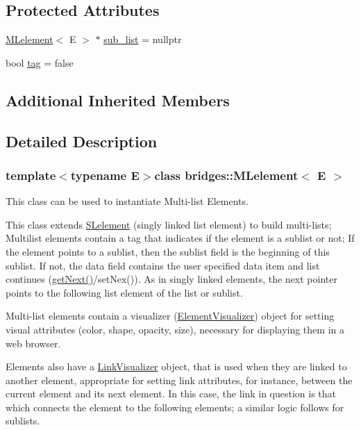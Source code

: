 \subsection*{Protected Attributes}
\begin{DoxyCompactItemize}
\item 
\hyperlink{classbridges_1_1_m_lelement}{M\+Lelement}$<$ E $>$ $\ast$ \hyperlink{classbridges_1_1_m_lelement_aa664b4e694c08e5cc31cc9d317dda100}{sub\+\_\+list} = nullptr
\item 
bool \hyperlink{classbridges_1_1_m_lelement_a0285a07355b2bc3d064c30e20aa2fd55}{tag} = false
\end{DoxyCompactItemize}
\subsection*{Additional Inherited Members}


\subsection{Detailed Description}
\subsubsection*{template$<$typename E$>$class bridges\+::\+M\+Lelement$<$ E $>$}

This class can be used to instantiate Multi-\/list Elements. 

This class extends \hyperlink{classbridges_1_1_s_lelement}{S\+Lelement} (singly linked list element) to build multi-\/lists; Multilist elements contain a tag that indicates if the element is a sublist or not; If the element points to a sublist, then the sublist field is the beginning of this sublist. If not, the data field contains the user specified data item and list continues (\hyperlink{classbridges_1_1_m_lelement_aceebd292e7d497f44eea5c4845e7709f}{get\+Next()}/set\+Nex()). As in singly linked elements, the next pointer points to the following list element of the list or sublist.

Multi-\/list elements contain a visualizer (\hyperlink{classbridges_1_1_element_visualizer}{Element\+Visualizer}) object for setting visual attributes (color, shape, opacity, size), necessary for displaying them in a web browser.

Elements also have a \hyperlink{classbridges_1_1_link_visualizer}{Link\+Visualizer} object, that is used when they are linked to another element, appropriate for setting link attributes, for instance, between the current element and its next element. In this case, the link in question is that which connects the element to the following elements; a similar logic follows for sublists.

